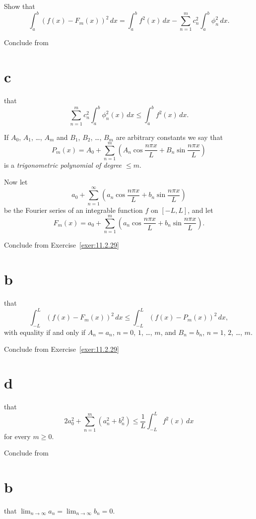 \begin{exerciselist}
\begin{alist}
    \item %
    Show that
    \[
      \int_{a}^{b}(f(x)-F_{m}(x))^{2}\,dx=\int_{a}^{b}f^{2}(x)\,dx-\sum_{n=1}^{m}c_{n}^{2}\int_{a}^{b}\phi_{n}^{2}\,dx.
    \]

    \item %
    Conclude from \part{c} that
    \[
      \sum_{n=1}^{m}c_{n}^{2}\int_{a}^{b}\phi_{n}^{2}(x)\,dx\le\int_{a}^{b}f^{2}(x)\,dx.
    \]
  \end{alist}

  \item\label{exer:11.2.30} If $A_{0}$, $A_{1}$, \dots, $A_{m}$ and $B_{1}$, $B_{2}$, \dots, $B_{m}$
        are arbitrary constants we say that
  \[
    P_{m}(x)=A_{0}+\sum_{n=1}^{m}\left(A_{n}\cos\frac{n\pi x}{L}+B_{n}\sin\frac{n\pi x}{L}\right)
  \]
  is a {\color{blue}\it trigonometric polynomial of degree $\le m$\/}.

  Now let
  \[
    a_{0}+\sum_{n=1}^{\infty}\left(a_{n}\cos\frac{n\pi x}{L}+b_{n}\sin\frac{n\pi x}{L}\right)
  \]
  be the Fourier series of an integrable function $f$ on $[-L,L]$, and let
  \[
    F_{m}(x)= a_{0}+\sum_{n=1}^{m}\left(a_{n}\cos\frac{n\pi x}{L}+b_{n}\sin\frac{n\pi x}{L}\right).
  \]
  \begin{alist}
    \item %
    Conclude from Exercise~\ref{exer:11.2.29}\part{b} that
    \[
      \int_{-L}^{L}(f(x)-F_{m}(x))^{2}\,dx\le \int_{-L}^{L}(f(x)-P_{m}(x))^{2}\,dx,
    \]
    with equality if and only if $A_{n}=a_{n}$, $n=0$, $1$, \dots, $m$, and $B_{n}=b_{n}$, $n=1$,
    $2$, \dots, $m$.

    \item %
    Conclude from Exercise~\ref{exer:11.2.29}\part{d} that
    \[
      2a_{0}^{2}+\sum_{n=1}^{m}(a_{n}^{2}+b_{n}^{2})\le\frac{1}{L}\int_{-L}^{L}f^{2}(x)\,dx
    \]
    for every $m\ge0$.

    \item %
    Conclude from \part{b} that $\lim_{n\to\infty}a_{n}=\lim_{n\to\infty}b_{n}=0$.
  \end{alist}
\end{exerciselist}
